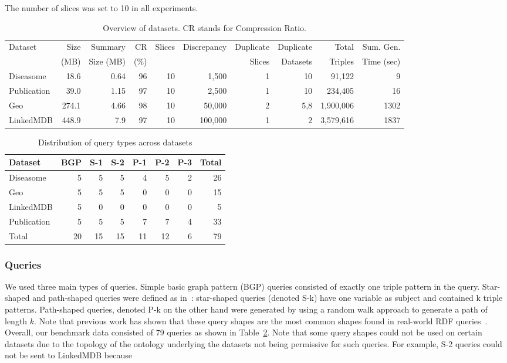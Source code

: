 \documentclass{sig-alternate}  %
\begin{document}
The number of slices was set to 10 in all experiments.
\begin{table}
\centering
\begin{tabular}{lrrrrrrrrr}
\hline
Dataset & Size  & Summary 	& CR   & Slices & Discrepancy & Duplicate  & Duplicate & Total 	& Sum. Gen. \\
				& (MB) 	& Size (MB) & (\%) &	  		 &  					 & Slices 		& Datasets 	& Triples & Time (sec)\\
\hline
Diseasome 			& 18.6 	& 0.64 	& 96 & 10 & 1,500 		& 1 & 10 			& 91,122 & 9\\
Publication 						& 39.0	& 1.15 	& 97 & 10 & 2,500 		& 1 & 10 			& 234,405 & 16\\
Geo 						& 274.1 & 4.66 	& 98 & 10 & 50,000 	& 2 & 5,8				& 1,900,006 & 1302\\
LinkedMDB 			& 448.9 & 7.9 	& 97 & 10 & 100,000 	& 1 & 2 			& 3,579,616 & 1837\\
\hline
\end{tabular}
\caption{Overview of datasets. CR stands for Compression Ratio.}
\label{tab:datasets}
\end{table}

\begin{table}
\centering
\begin{tabular}{lrrrrrrr}
\hline
Dataset 		& BGP  & S-1 & S-2 & P-1 & P-2 & P-3 & Total \\\hline
Diseasome 			& 5 & 5 & 5 & 4 & 5 & 2 & 26 \\
Geo  & 5 & 5 & 5 & 0 & 0 & 0 & 15 \\
LinkedMDB 			& 5 & 0 & 0 & 0 & 0 & 0 & 5 \\
Publication 		& 5 & 5 & 5 & 7 & 7 & 4 & 33 \\\hline
Total 					& 20 & 15 & 15 & 11 & 12 & 6 & 79\\
\hline
\end{tabular}
\caption{Distribution of query types across datasets}
\label{tab:queries}
\end{table}

\subsubsection{Queries}
We used three main types of queries. 
Simple basic graph pattern (BGP) queries consisted of exactly one triple pattern in the query.
Star-shaped and path-shaped queries were defined as in~\cite{key-5}: star-shaped queries (denoted S-k) have one variable as subject and contained k triple patterns. 
Path-shaped queries, denoted P-k on the other hand were generated by using a random walk approach to generate a path of length $k$. 
Note that previous work has shown that these query shapes are the most common shapes found in real-world RDF queries~\cite{key-35}.
Overall, our benchmark data consisted of 79 queries as shown in Table~\ref{tab:queries}.
Note that some query shapes could not be used on certain datasets due to the topology of the ontology underlying the datasets not being permissive for such queries. 
For example, S-2 queries could not be sent to LinkedMDB because 
\end{document}
